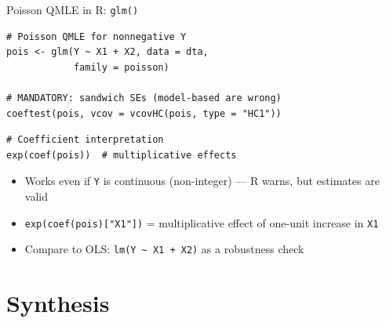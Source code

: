 \documentclass[aspectratio=169, handout, t]{beamer}
\numberwithin{equation}{section}
\begin{document}

\begin{frame}[fragile]{Poisson QMLE in R: \texttt{glm()}}

\begin{lstlisting}
# Poisson QMLE for nonnegative Y
pois <- glm(Y ~ X1 + X2, data = dta,
            family = poisson)

# MANDATORY: sandwich SEs (model-based are wrong)
coeftest(pois, vcov = vcovHC(pois, type = "HC1"))
\end{lstlisting}

\pause

\bigskip

\begin{lstlisting}
# Coefficient interpretation
exp(coef(pois))  # multiplicative effects
\end{lstlisting}

\pause

\bigskip

\begin{itemize}
    \item Works even if \texttt{Y} is continuous (non-integer) --- R warns, but estimates are valid
    \item \texttt{exp(coef(pois)["X1"])} = multiplicative effect of one-unit increase in \texttt{X1}
    \item Compare to OLS: \texttt{lm(Y \~{} X1 + X2)} as a robustness check
\end{itemize}

\end{frame}

\section{Synthesis}
\end{document}
